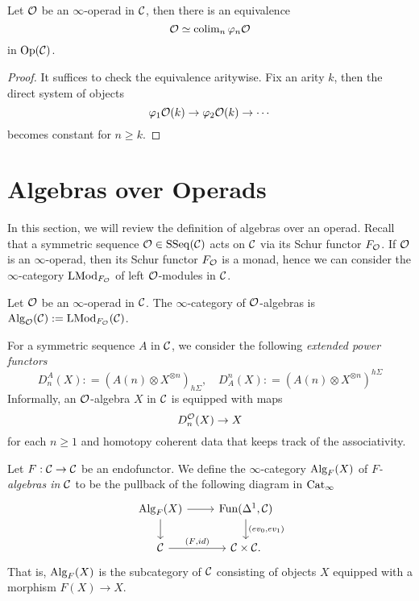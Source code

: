 \begin{proposition}
\label{Operad as a colimits}
	Let ${\mathcal{O}}$ be an $\infty$-operad in ${\mathcal{C}}$, 
	then there is an equivalence
	\[
	{\mathcal{O}} \simeq
	\operatorname{colim}_n \varphi_n {\mathcal{O}}
	\]
	in $\operatorname{Op}({\mathcal{C}})$.
\end{proposition}
\begin{proof}
    It suffices to check the equivalence aritywise.
    Fix an arity $k$, then the direct system of objects 
    $$
    \varphi_1{\mathcal{O}}(k) \to \varphi_2{\mathcal{O}}(k) \to \cdots    
    $$
    becomes constant for $n \geq k$.
\end{proof}





\section{Algebras over Operads}
In this section, we will review the definition of algebras over an operad.
Recall that a symmetric sequence ${\mathcal{O}}\in\operatorname{SSeq}({\mathcal{C}})$ acts on ${\mathcal{C}}$ via its Schur functor $F_{{\mathcal{O}}}$.
If ${\mathcal{O}}$ is an $\infty$-operad, then its Schur functor $F_{\mathcal{O}}$ is a monad, hence we can consider the $\infty$-category $\operatorname{LMod}_{F_{\mathcal{O}}}$ of left ${\mathcal{O}}$-modules in ${\mathcal{C}}$.
\begin{definition}
	\label{algebras over an operad}
	Let ${\mathcal{O}}$ be an $\infty$-operad in ${\mathcal{C}}$. The $\infty$-category of ${\mathcal{O}}$-algebras is $\operatorname{Alg}_{{\mathcal{O}}}({\mathcal{C}}):= \operatorname{LMod}_{F_{\mathcal{O}}}({\mathcal{C}})$.
\end{definition}

For a symmetric sequence $A$ in ${\mathcal{C}}$, we consider the following \emph{extended power functors}
$$
D^{A}_n(X): = (A(n)\otimes X^{\otimes n })_{h\Sigma}, 
\quad
D_{A}^n(X): = (A(n)\otimes X^{\otimes n })^{h\Sigma}
$$
Informally, an ${\mathcal{O}}$-algebra $X$ in ${\mathcal{C}}$ is equipped with maps
$$
D^{{\mathcal{O}}}_n(X) \to X
$$
for each $n\geq 1$ and homotopy coherent data that keeps track of the associativity.

\begin{definition}
Let $F:{\mathcal{C}}\to {\mathcal{C}}$ be an endofunctor.
	We define the $\infty$-category $\operatorname{Alg}_{F}(X)$ of \emph{$F$-algebras in ${\mathcal{C}}$} to be the pullback of the following diagram in $\operatorname{Cat}_{\infty}$
\[
\begin{tikzcd}
	\Alg_{F}(X) & 
	\Fun(\Delta^1, \CC)\\
	\CC & 
	\CC \times \CC
	\arrow[from=1-1, to= 1-2]
	\arrow[from=1-1, to=2-1]
	\arrow[from=1-2, to=2-2, "(ev_0\text{,} ev_1)"]
	\arrow[from=2-1, to= 2-2, "(F\text{,} id)"].
\end{tikzcd}
\]
That is, $\operatorname{Alg}_{F}(X)$ is the subcategory of ${\mathcal{C}}$ consisting of objects $X$ equipped with a morphism $F(X)\to X$.
\end{definition}

